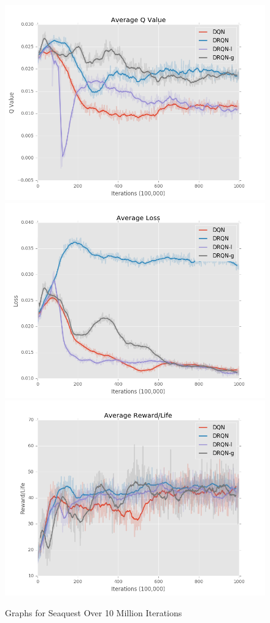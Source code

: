 \documentclass{article}
\begin{document}
\begin{figure}[h]
    \centering
    \begin{minipage}{1.0\textwidth}
        \centering
        \includegraphics[scale=0.2]{Seaquest10M_1}
        \centering
        \includegraphics[scale=0.2]{Seaquest10M_2}
        \centering
        \includegraphics[scale=0.2]{Seaquest10M_3}
    \end{minipage}
    \caption{Graphs for Seaquest Over 10 Million Iterations}
\end{figure}
\end{document}
